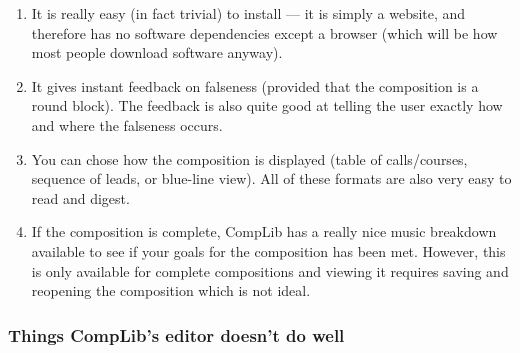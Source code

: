 \documentclass[12pt]{article}
\begin{document}
\begin{enumerate}
    \item It is really easy (in fact trivial) to install --- it is simply a website, and therefore
        has no software dependencies except a browser (which will be how most people download
        software anyway).
    \item It gives instant feedback on falseness (provided that the composition is a round block).
        The feedback is also quite good at telling the user exactly how and where the falseness
        occurs.
    \item You can chose how the composition is displayed (table of calls/courses, sequence of leads,
        or blue-line view).  All of these formats are also very easy to read and digest.
    \item If the composition is complete, CompLib has a really nice music breakdown available to see
        if your goals for the composition has been met.  However, this is only available for
        complete compositions and viewing it requires saving and reopening the composition which is
        not ideal.
\end{enumerate}

\subsubsection{Things CompLib's editor doesn't do well}
\end{document}
